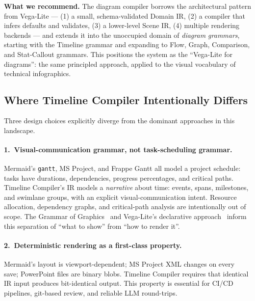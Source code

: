 \medskip\noindent
\textbf{What we recommend.}
The diagram compiler borrows the architectural pattern from
Vega-Lite --- (1) a small, schema-validated Domain IR, (2) a compiler that
infers defaults and validates, (3) a lower-level Scene IR, (4) multiple
rendering backends --- and extends it into the unoccupied domain of
\emph{diagram grammars}, starting with the Timeline grammar and expanding
to Flow, Graph, Comparison, and Stat-Callout grammars.
This positions the system as the ``Vega-Lite for diagrams'': the same
principled approach, applied to the visual vocabulary of technical
infographics.

\subsection{Where Timeline Compiler Intentionally Differs}
\label{sec:comparison-intent}

Three design choices explicitly diverge from the dominant approaches in
this landscape.

\paragraph{1.\ Visual-communication grammar, not task-scheduling grammar.}
Mermaid's \texttt{gantt}, MS Project, and Frappe Gantt all model a project
schedule: tasks have durations, dependencies, progress percentages, and
critical paths.
Timeline Compiler's IR models a \emph{narrative} about time: events, spans,
milestones, and swimlane groups, with an explicit visual-communication intent.
Resource allocation, dependency graphs, and critical-path analysis are
intentionally out of scope.
The Grammar of Graphics~\cite{grammarofgraphics2005} and Vega-Lite's
declarative approach~\cite{vegalite2017} inform this separation of
``what to show'' from ``how to render it''.

\paragraph{2.\ Deterministic rendering as a first-class property.}
Mermaid's layout is viewport-dependent; MS Project XML changes on every
save; PowerPoint files are binary blobs.
Timeline Compiler requires that identical IR input produces bit-identical
output.
This property is essential for CI/CD pipelines, git-based review, and
reliable LLM round-trips.

